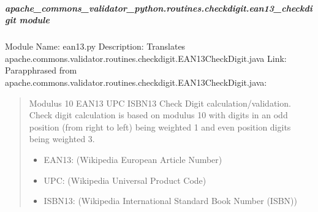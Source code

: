 \documentclass[letterpaper,10pt,english]{sphinxmanual}
\begin{document}
\subparagraph{apache\_commons\_validator\_python.routines.checkdigit.ean13\_checkdigit module}
\label{\detokenize{apache_commons_validator_python.routines.checkdigit:module-apache_commons_validator_python.routines.checkdigit.ean13_checkdigit}}\label{\detokenize{apache_commons_validator_python.routines.checkdigit:apache-commons-validator-python-routines-checkdigit-ean13-checkdigit-module}}
\sphinxAtStartPar
Module Name: ean13.py
Description: Translates apache.commons.validator.routines.checkdigit.EAN13CheckDigit.java
Link: 
Parapphrased from apache.commons.validator.routines.checkdigit.EAN13CheckDigit.java:
\begin{quote}

\sphinxAtStartPar
Modulus 10 EAN\sphinxhyphen{}13 UPC ISBN\sphinxhyphen{}13 Check Digit calculation/validation.
Check digit calculation is based on modulus 10 with digits in an odd position (from right to left) being weighted 1 and even position digits being weighted 3.
\begin{description}
\begin{itemize}
\item {} 
\sphinxAtStartPar
EAN\sphinxhyphen{}13:  (Wikipedia \sphinxhyphen{} European Article Number)

\item {} 
\sphinxAtStartPar
UPC:  (Wikipedia \sphinxhyphen{} Universal Product Code)

\item {} 
\sphinxAtStartPar
ISBN\sphinxhyphen{}13:  (Wikipedia \sphinxhyphen{} International Standard Book Number (ISBN))

\end{itemize}

\end{description}
\end{quote}
\end{document}
